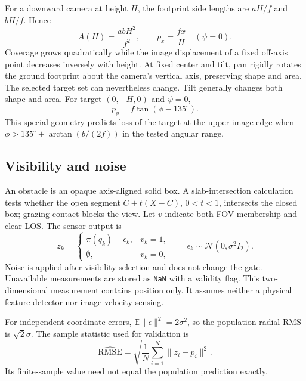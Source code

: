 \documentclass[11pt,letterpaper]{article}
\begin{document}
For a downward camera at height $H$, the footprint side lengths are $aH/f$ and $bH/f$. Hence
\begin{equation}
A(H)=\frac{abH^2}{f^2},\qquad p_x=\frac{fx}{H}\quad(\psi=0).
\label{eq:height}
\end{equation}
Coverage grows quadratically while the image displacement of a fixed off-axis point decreases inversely with height. At fixed center and tilt, pan rigidly rotates the ground footprint about the camera's vertical axis, preserving shape and area. The selected target set can nevertheless change. Tilt generally changes both shape and area. For target $(0,-H,0)$ and $\psi=0$,
\begin{equation}
p_y=f\tan(\phi-135^\circ).
\label{eq:tilt}
\end{equation}
This special geometry predicts loss of the target at the upper image edge when $\phi>135^\circ+\arctan(b/(2f))$ in the tested angular range.

\subsection{Visibility and noise}
An obstacle is an opaque axis-aligned solid box. A slab-intersection calculation tests whether the open segment $C+t(X-C)$, $0<t<1$, intersects the closed box; grazing contact blocks the view. Let $v$ indicate both FOV membership and clear LOS. The sensor output is
\begin{equation}
z_k=\begin{cases}\pi(q_k)+\epsilon_k,&v_k=1,\\
\emptyset,&v_k=0,
\end{cases}\qquad \epsilon_k\sim\mathcal N(0,\sigma^2 I_2).
\label{eq:measurement}
\end{equation}
Noise is applied after visibility selection and does not change the gate. Unavailable measurements are stored as \texttt{NaN} with a validity flag. This two-dimensional measurement contains position only. It assumes neither a physical feature detector nor image-velocity sensing.

For independent coordinate errors, $\mathbb E\|\epsilon\|^2=2\sigma^2$, so the population radial RMS is $\sqrt2\sigma$. The sample statistic used for validation is
\begin{equation}
\widehat{\mathrm{RMSE}}=\sqrt{\frac1N\sum_{i=1}^{N}\|z_i-p_i\|^2}.
\label{eq:rmse}
\end{equation}
Its finite-sample value need not equal the population prediction exactly.
\end{document}
